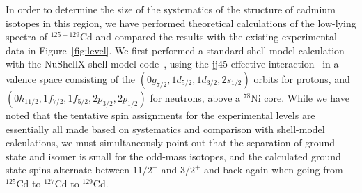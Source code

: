 \documentclass[twocolumn,prc,showpacs,preprintnumbers,amsmath,amssymb,superscriptaddress,nofootinbib,aps,10pt]{revtex4-1}
\begin{document}


In order to determine the size of the systematics of the structure of cadmium isotopes in this region, we have performed theoretical calculations of the low-lying spectra of $^{125-129}$Cd and compared the results with the existing experimental data in Figure~\ref{fig:level}.
We first performed a standard shell-model calculation with the NuShellX shell-model code~\cite{Brown2003}, using the jj45 effective interaction~\cite{Dillmann2003} in a valence space consisting of the ${(0g_{7/2},1d_{5/2},1d_{3/2},2s_{1/2})}$ orbits for protons, and ${(0h_{11/2},1f_{7/2},1f_{5/2},2p_{3/2},2p_{1/2})}$ for neutrons, above a $^{78}$Ni core.
While we have noted that the tentative spin assignments for the experimental levels are essentially all made based on systematics and comparison with shell-model calculations, we must simultaneously point out that the separation of ground state and isomer is small for the odd-mass isotopes, and the calculated ground state spins alternate between $11/2^{-}$ and $3/2^+$ and back again when going from $^{125}$Cd to $^{127}$Cd to $^{129}$Cd.
\end{document}
